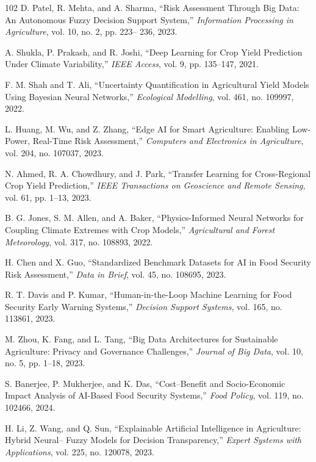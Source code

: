 \documentclass[preprint,12pt]{elsarticle}
\begin{document}
\begin{thebibliography}{102}
		D. Patel, R. Mehta, and A. Sharma, ``Risk Assessment Through Big Data: An Autonomous Fuzzy Decision Support System,'' \emph{Information Processing in Agriculture}, vol. 10, no. 2, pp. 223-- 236, 2023.
		
		A. Shukla, P. Prakash, and R. Joshi, ``Deep Learning for Crop Yield Prediction Under Climate Variability,'' \emph{IEEE Access}, vol. 9, pp. 135--147, 2021.
		
		F. M. Shah and T. Ali, ``Uncertainty Quantification in Agricultural Yield Models Using Bayesian Neural Networks,'' \emph{Ecological Modelling}, vol. 461, no. 109997, 2022.
		
		L. Huang, M. Wu, and Z. Zhang, ``Edge AI for Smart Agriculture: Enabling Low-Power, Real-Time Risk Assessment,'' \emph{Computers and Electronics in Agriculture}, vol. 204, no. 107037, 2023.
		
		N. Ahmed, R. A. Chowdhury, and J. Park, ``Transfer Learning for Cross-Regional Crop Yield Prediction,'' \emph{IEEE Transactions on Geoscience and Remote Sensing}, vol. 61, pp. 1--13, 2023.
		
		B. G. Jones, S. M. Allen, and A. Baker, ``Physics-Informed Neural Networks for Coupling Climate Extremes with Crop Models,'' \emph{Agricultural and Forest Meteorology}, vol. 317, no. 108893, 2022.
		
		H. Chen and X. Guo, ``Standardized Benchmark Datasets for AI in Food Security Risk Assessment,'' \emph{Data in Brief}, vol. 45, no. 108695, 2023.
		
		R. T. Davis and P. Kumar, ``Human-in-the-Loop Machine Learning for Food Security Early Warning Systems,'' \emph{Decision Support Systems}, vol. 165, no. 113861, 2023.
		
		M. Zhou, K. Fang, and L. Tang, ``Big Data Architectures for Sustainable Agriculture: Privacy and Governance Challenges,'' \emph{Journal of Big Data}, vol. 10, no. 5, pp. 1--18, 2023.
		
		S. Banerjee, P. Mukherjee, and K. Das, ``Cost--Benefit and Socio-Economic Impact Analysis of AI-Based Food Security Systems,'' \emph{Food Policy}, vol. 119, no. 102466, 2024.
		
		H. Li, Z. Wang, and Q. Sun, ``Explainable Artificial Intelligence in Agriculture: Hybrid Neural-- Fuzzy Models for Decision Transparency,'' \emph{Expert Systems with Applications}, vol. 225, no. 120078, 2023.
		

\end{thebibliography}
\end{document}
